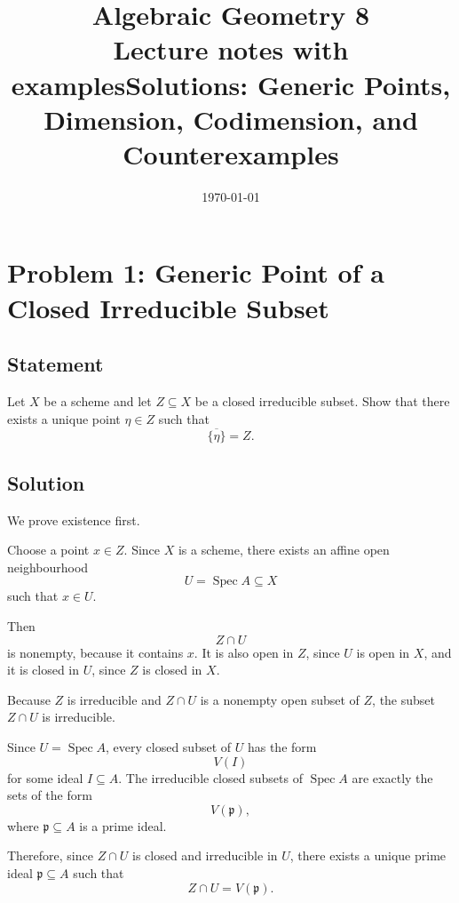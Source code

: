 \documentclass[12pt,a4paper]{article}
\title{\bfseries Algebraic Geometry 8\\


\large Lecture notes with examples}
\author{}
\date{\today}
\DeclareMathOperator{\Spec}{Spec}
\providecommand{\Spec}{\operatorname{Spec}}
\theoremstyle{notespace}
\begin{document}
\maketitle
\tableofcontents
\clearpage


\title{Solutions: Generic Points, Dimension, Codimension, and Counterexamples}
\author{}
\date{}
\maketitle

\tableofcontents

\newpage

\section{Problem 1: Generic Point of a Closed Irreducible Subset}

\subsection*{Statement}

Let \(X\) be a scheme and let \(Z\subseteq X\) be a closed irreducible subset. Show that there exists a unique point \(\eta\in Z\) such that
\[
\overline{\{\eta\}}=Z.
\]

\subsection*{Solution}

We prove existence first.

Choose a point \(x\in Z\). Since \(X\) is a scheme, there exists an affine open neighbourhood
\[
U=\Spec A\subseteq X
\]
such that \(x\in U\).

Then
\[
Z\cap U
\]
is nonempty, because it contains \(x\). It is also open in \(Z\), since \(U\) is open in \(X\), and it is closed in \(U\), since \(Z\) is closed in \(X\).

Because \(Z\) is irreducible and \(Z\cap U\) is a nonempty open subset of \(Z\), the subset \(Z\cap U\) is irreducible.

Since \(U=\Spec A\), every closed subset of \(U\) has the form
\[
V(I)
\]
for some ideal \(I\subseteq A\). The irreducible closed subsets of \(\Spec A\) are exactly the sets of the form
\[
V(\mathfrak p),
\]
where \(\mathfrak p\subseteq A\) is a prime ideal.

Therefore, since \(Z\cap U\) is closed and irreducible in \(U\), there exists a unique prime ideal \(\mathfrak p\subseteq A\) such that
\[
Z\cap U=V(\mathfrak p).
\]
\end{document}
